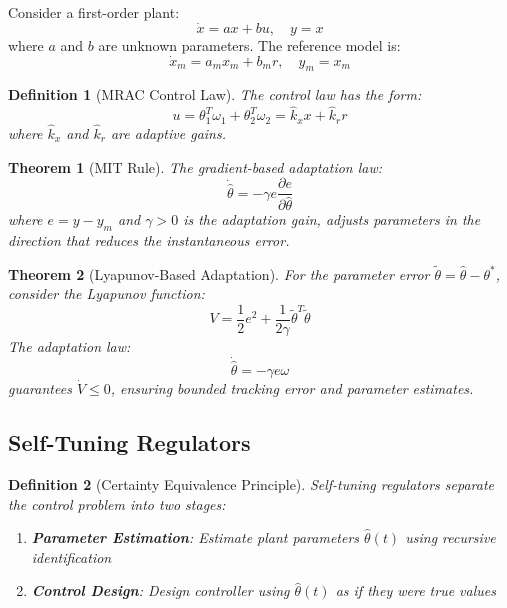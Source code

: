 \documentclass[a4paper, 11pt]{article}
\newtheorem{definition}{Definition}[section]
\newtheorem{theorem}{Theorem}[section]
\begin{document}
Consider a first-order plant:
\begin{equation}
\dot{x} = ax + bu, \quad y = x
\end{equation}
where $a$ and $b$ are unknown parameters. The reference model is:
\begin{equation}
\dot{x}_m = a_m x_m + b_m r, \quad y_m = x_m
\end{equation}

\begin{definition}[MRAC Control Law]
The control law has the form:
\begin{equation}
u = \theta_1^T \omega_1 + \theta_2^T \omega_2 = \hat{k}_x x + \hat{k}_r r
\end{equation}
where $\hat{k}_x$ and $\hat{k}_r$ are adaptive gains.
\end{definition}

\begin{theorem}[MIT Rule]
The gradient-based adaptation law:
\begin{equation}
\dot{\hat{\theta}} = -\gamma e \frac{\partial e}{\partial \hat{\theta}}
\end{equation}
where $e = y - y_m$ and $\gamma > 0$ is the adaptation gain, adjusts parameters in the
direction that reduces the instantaneous error.
\end{theorem}

\begin{theorem}[Lyapunov-Based Adaptation]
For the parameter error $\tilde{\theta} = \hat{\theta} - \theta^*$, consider the Lyapunov
function:
\begin{equation}
V = \frac{1}{2}e^2 + \frac{1}{2\gamma}\tilde{\theta}^T\tilde{\theta}
\end{equation}
The adaptation law:
\begin{equation}
\dot{\hat{\theta}} = -\gamma e \omega
\end{equation}
guarantees $\dot{V} \leq 0$, ensuring bounded tracking error and parameter estimates.
\end{theorem}

\subsection{Self-Tuning Regulators}

\begin{definition}[Certainty Equivalence Principle]
Self-tuning regulators separate the control problem into two stages:
\begin{enumerate}
\item \textbf{Parameter Estimation}: Estimate plant parameters $\hat{\theta}(t)$ using recursive identification
\item \textbf{Control Design}: Design controller using $\hat{\theta}(t)$ as if they were true values
\end{enumerate}
\end{definition}
\end{document}
